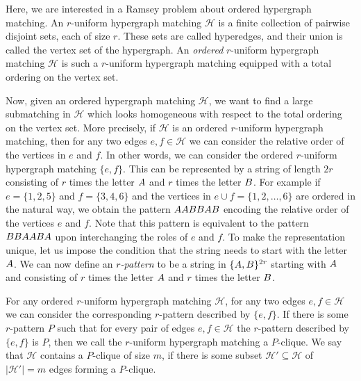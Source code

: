 \documentclass[11pt]{article}
\theoremstyle{definition}
\numberwithin{equation}{section}
\numberwithin{figure}{section}
\newcommand{\su}{\subseteq}
\newcommand{\HH}{\mathcal{H}}
\begin{document}
Here, we are interested in a Ramsey problem about ordered hypergraph matching. An $r$-uniform hypergraph matching $\HH$ is a finite collection of pairwise disjoint sets, each of size $r$. These sets are called hyperedges, and their union is called the vertex set of the hypergraph. An \emph{ordered} $r$-uniform hypergraph matching $\HH$ is such a $r$-uniform hypergraph matching equipped with a total ordering on the vertex set.

Now, given an ordered hypergraph matching $\HH$, we want to find a large submatching in $\HH$ which looks homogeneous with respect to the total ordering on the vertex set.
More precisely, if $\HH$ is an ordered $r$-uniform hypergraph matching, then for any two edges $e,f\in\HH$ we can consider the relative order of the vertices in $e$ and $f$. In other words, we can consider the ordered $r$-uniform hypergraph matching $\{ e,f\}$. This can be represented by a string of length $2r$ consisting of $r$ times the letter $\rm A$ and $r$ times the letter $\rm B$. For example if $e=\{ 1,2,5\}$ and $f=\{ 3,4,6\}$ and the vertices in $e\cup f=\{1,2,\dots,6\}$ are ordered in the natural way, we obtain the pattern $\rm AABBAB$ encoding the relative order of the vertices $e$ and $f$. Note that this pattern is equivalent to the pattern $\rm BBAABA$ upon interchanging the roles of $e$ and $f$. To make the representation unique, let us impose the condition that the string needs to start with the letter $\rm A$. We can now define an \emph{$r$-pattern} to be a string in $\{{\rm A},{\rm B}\}^{2r}$ starting with $\rm A$ and consisting of $r$ times the letter $\rm A$ and $r$ times the letter $\rm B$.

For any ordered $r$-uniform hypergraph matching $\HH$, for any two edges $e,f\in\HH$ we can consider the corresponding $r$-pattern described by $\{ e,f\}$. If there is some $r$-pattern $P$ such that for every pair of edges $e,f\in\HH$ the $r$-pattern described by $\{ e,f\}$ is $P$, then we call the $r$-uniform hypergraph matching a $P$-clique. We say that $\HH$ contains a $P$-clique of size $m$, if there is some subset $\HH'\su \HH$ of $|\HH'|=m$ edges forming a $P$-clique.
\end{document}
